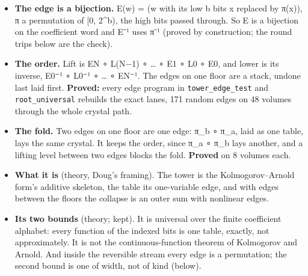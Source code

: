 \begin{itemize}
\item \textbf{The edge is a bijection.} E(w) = (w with its low b bits x replaced by π(x)), π a permutation of [0, 2\textasciicircum{}b), the high bits passed through. So E is a bijection on the coefficient word and E⁻¹ uses π⁻¹ (proved by construction; the round trips below are the check).
\item \textbf{The order.} Lift is EN ∘ L(N−1) ∘ … ∘ E1 ∘ L0 ∘ E0, and lower is its inverse, E0⁻¹ ∘ L0⁻¹ ∘ … ∘ EN⁻¹. The edges on one floor are a stack, undone last laid first. \textbf{Proved:} every edge program in \texttt{tower\_\allowbreak{}edge\_\allowbreak{}test} and \texttt{root\_\allowbreak{}universal} rebuilds the exact lanes, 171 random edges on 48 volumes through the whole crystal path.
\item \textbf{The fold.} Two edges on one floor are one edge: π\_\allowbreak{}b ∘ π\_\allowbreak{}a, laid as one table, lays the same crystal. It keeps the order, since π\_\allowbreak{}a ∘ π\_\allowbreak{}b lays another, and a lifting level between two edges blocks the fold. \textbf{Proved} on 8 volumes each.
\item \textbf{What it is} (theory, Doug's framing). The tower is the Kolmogorov–Arnold form's additive skeleton, the table its one-variable edge, and with edges between the floors the collapse is an outer sum with nonlinear edges.
\item \textbf{Its two bounds} (theory; kept). It is universal over the finite coefficient alphabet: every function of the indexed bits is one table, exactly, not approximately. It is not the continuous-function theorem of Kolmogorov and Arnold. And inside the reversible stream every edge is a permutation; the second bound is one of width, not of kind (below).

\end{itemize}
